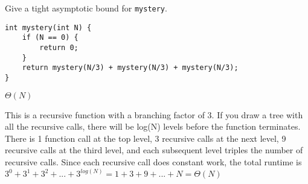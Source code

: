 \begin{blocksection}
\question Give a tight asymptotic bound for \lstinline$mystery$.

\begin{lstlisting}
int mystery(int N) {
    if (N == 0) {
        return 0;
    }
    return mystery(N/3) + mystery(N/3) + mystery(N/3);
}
\end{lstlisting}

\begin{solution}[1in]
$\Theta(N)$

This is a recursive function with a branching factor of 3. If you draw a tree with all the recursive calls, there will be log(N) levels before the function terminates. There is 1 function call at the top level, 3 recursive calls at the next level, 9 recursive calls at the third level, and each subsequent level triples the number of recursive calls. Since each recursive call does constant work, the total runtime is $3^0 + 3^1 + 3^2 + ... + 3^{log(N)} = 1 + 3 + 9 + ... + N = \Theta(N)$
\end{solution}
\end{blocksection}
